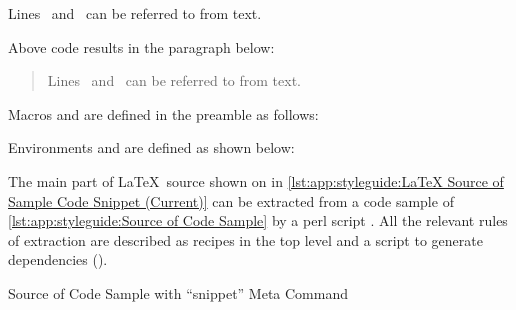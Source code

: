 \begin{VerbatimU}
\begin{fcvref}[ln:base1]
Lines~ and~ can be referred
to from text.
\end{fcvref}
\end{VerbatimU}

Above code results in the paragraph below:

\begin{quote}
\begin{fcvref}[ln:base1]
Lines~ and~ can be referred
to from text.
\end{fcvref}
\end{quote}

Macros \qco{\\lnlbl\{\}} and \qco{\\lnref\{\}} are defined in
the preamble as follows:

\begin{VerbatimU}
\newcommand{\lnlblbase}{}
\newcommand{\lnlbl}[1]{%
  \phantomsection\label{\lnlblbase:#1}}
\newcommand{\lnrefbase}{}
\newcommand{\lnref}[1]{\ref{\lnrefbase:#1}}
\end{VerbatimU}

Environments  and  are defined as
shown below:

\begin{VerbatimU}
\newenvironment{fcvlabel}[1][]{%
  \renewcommand{\lnlblbase}{#1}%
  \ignorespaces}{\ignorespacesafterend}
\newenvironment{fcvref}[1][]{%
  \renewcommand{\lnrefbase}{#1}%
  \ignorespaces}{\ignorespacesafterend}
\end{VerbatimU}

\begin{fcvref}
The main part of \LaTeX\ source shown on
 in
\cref{lst:app:styleguide:LaTeX Source of Sample Code Snippet (Current)}
can be extracted from a code sample of
\cref{lst:app:styleguide:Source of Code Sample} by a perl script
.
All the relevant rules of extraction are described as recipes in the
top level  and a script to generate dependencies
().
\end{fcvref}

\begin{listing*}
\vspace*{-9pt}
\caption{Source of Code Sample with ``snippet'' Meta Command}
\label{lst:app:styleguide:Source of Code Sample}
\end{listing*}

